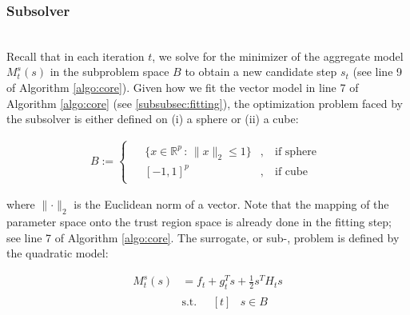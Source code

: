 \subsubsection{Subsolver}
\label{subsubsec:subsolver}
\hfill\\

\noindent Recall that in each iteration $t$, we solve for the minimizer of the aggregate model $M_{t}^{s} (s)$ in the subproblem space $B$ to obtain a new candidate step $s_t$ (see line 9 of Algorithm \ref{algo:core}).
Given how we fit the vector model in line 7 of Algorithm \ref{algo:core} (see \ref{subsubsec:fitting}), the optimization problem faced by the subsolver is either defined on (i) a sphere or (ii) a cube:


\begin{align}
    B := \begin{cases}
    \begin{aligned}
        & \{x \in \mathbb{R}^p \, : \, \lVert x \rVert_2 \leq 1 \} & , \ & \text{if sphere} \\
        & [-1, 1]^p & , \ & \text{if cube}
    \end{aligned}
    \end{cases}
    \label{eq:ball-metric}
\end{align}

\noindent where $\lVert\cdot\rVert_2$ is the Euclidean norm of a vector.
Note that the mapping of the parameter space onto the trust region space is already done in the fitting step; see line 7 of Algorithm \ref{algo:core}.
The surrogate, or sub-, problem is defined by the quadratic model:

\begin{align}
    M_{t}^{s} (s) &= f_t + g_t^T s + \frac{1}{2} s^T H_t s \\
    &\text{s.t.} \quad \begin{aligned}[t]
        & s \in B
    \end{aligned}
    \label{eq:quad-subproblem}
\end{align}


